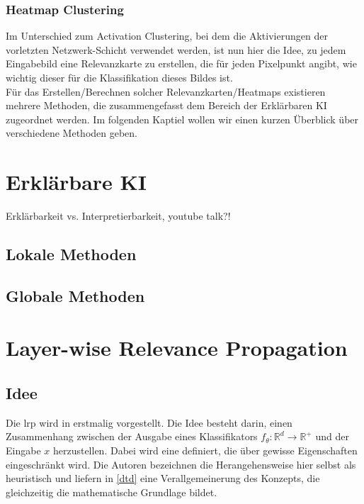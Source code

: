\documentclass[11pt,a4paper]{article}
\numberwithin{equation}{section}
\begin{document}
	\subsubsection{Heatmap Clustering}
	Im Unterschied zum Activation Clustering, bei dem die Aktivierungen der vorletzten Netzwerk-Schicht verwendet werden, ist nun hier die Idee, zu jedem Eingabebild eine Relevanzkarte zu erstellen, die für jeden Pixelpunkt angibt, wie wichtig dieser für die Klassifikation dieses Bildes ist. \\
	
	Für das Erstellen/Berechnen solcher Relevanzkarten/Heatmaps existieren mehrere Methoden, die zusammengefasst dem Bereich der Erklärbaren KI zugeordnet werden.
	Im folgenden Kaptiel wollen wir einen kurzen Überblick über verschiedene Methoden geben.
	
	
	\section{Erklärbare KI} \label{chapter_xai}
	
	Erklärbarkeit vs. Interpretierbarkeit, youtube talk?!
	
	\subsection{Lokale Methoden}
	
	\subsection{Globale Methoden}
	
	\section{Layer-wise Relevance Propagation} \label{chapter_lrp}
	\subsection{Idee}
	
	Die \gls{lrp} wird in \cite{LRP_first_paper} erstmalig vorgestellt. Die Idee besteht darin, einen Zusammenhang zwischen der Ausgabe eines Klassifikators $f_{\theta}: \mathbb{R}^d\to \mathbb{R^{+}}$ und der Eingabe $x$ herzustellen. Dabei wird eine definiert, die über gewisse Eigenschaften eingeschränkt wird. Die Autoren bezeichnen die Herangehensweise hier selbst als heuristisch und liefern in \ref{dtd} eine Verallgemeinerung des Konzepts, die gleichzeitig die mathematische Grundlage bildet.\\
	
\end{document}
